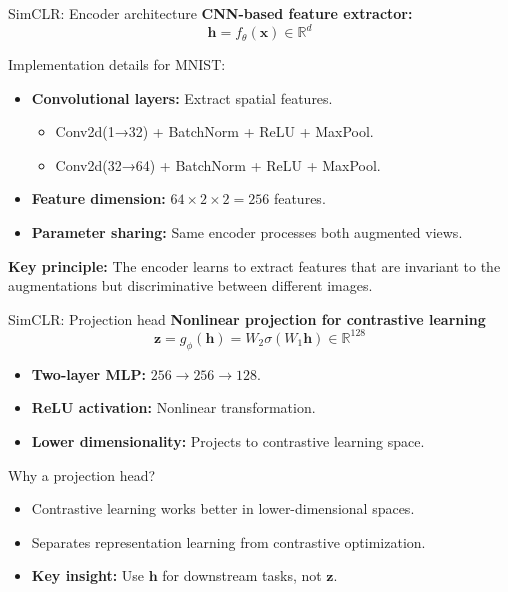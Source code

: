 \documentclass{beamer}
\begin{document}
\begin{frame}{SimCLR: Encoder architecture}
\textbf{CNN-based feature extractor:}
$$\mathbf{h} = f_\theta(\mathbf{x}) \in \mathbb{R}^d$$

\vspace{0.3cm}
Implementation details for MNIST:
\begin{itemize}
\item \textbf{Convolutional layers:} Extract spatial features.
  \begin{itemize}
  \item Conv2d(1→32) + BatchNorm + ReLU + MaxPool.
  \item Conv2d(32→64) + BatchNorm + ReLU + MaxPool.
  \end{itemize}
\vspace{0.2cm}
\item \textbf{Feature dimension:} $64 \times 2 \times 2 = 256$ features.
\vspace{0.2cm}
\item \textbf{Parameter sharing:} Same encoder processes both augmented views.
\end{itemize}

\vspace{0.3cm} \textbf{Key principle:} The encoder learns to extract
features that are \alert{invariant} to the augmentations but
\alert{discriminative} between different images.
\end{frame}

\begin{frame}{SimCLR: Projection head}
\textbf{Nonlinear projection for contrastive learning}
$$\mathbf{z} = g_\phi(\mathbf{h}) = W_2 \sigma(W_1 \mathbf{h}) \in \mathbb{R}^{128}$$

\vspace{0.3cm}
\begin{itemize}
\item \textbf{Two-layer MLP:} $256 \rightarrow 256 \rightarrow 128$.
\item \textbf{ReLU activation:} Nonlinear transformation.
\item \textbf{Lower dimensionality:} Projects to contrastive learning space.
\end{itemize}

\vspace{0.5cm}
\begin{alertblock}{Why a projection head?}
\begin{itemize}
\item Contrastive learning works better in \alert{lower-dimensional} spaces.
\item Separates representation learning from contrastive optimization.
\item \textbf{Key insight:} Use $\mathbf{h}$ for downstream tasks, not $\mathbf{z}$.
\end{itemize}
\end{alertblock}
\end{frame}
\end{document}
